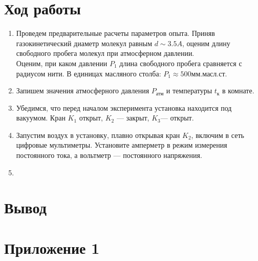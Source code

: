 \documentclass[12pt]{article}
\begin{document}
    \section{Ход работы}
        \begin{enumerate}
            \item Проведем предварительные расчеты параметров опыта. Приняв газокинетический диаметр молекул равным $d \sim 3.5 A$, оценим
            длину свободного пробега молекул при атмосферном давлении.\\
            Оценим, при каком давлении $P_1$ длина свободного пробега сравняется с радиусом нити. В единицах масляного столба: $P_1 \approx 500 \text{мм.масл.ст.}$
            \item Запишем значения атмосферного давления $P_{\text{атм}}$ и температуры $t_{\text{к}}$ в комнате.
            \item Убедимся, что перед началом эксперимента установка находится под вакуумом. Кран $K_1$ открыт, $K_2$ — закрыт, $K_3$— открыт.
            \item Запустим воздух в установку, плавно открывая кран $K_2$, включим в сеть цифровые мультиметры. Установите амперметр в режим
            измерения постоянного тока, а вольтметр — постоянного напряжения.
            \item


        \end{enumerate}
    \section{Вывод}

\newpage
\section{Приложение 1}

\end{document}
